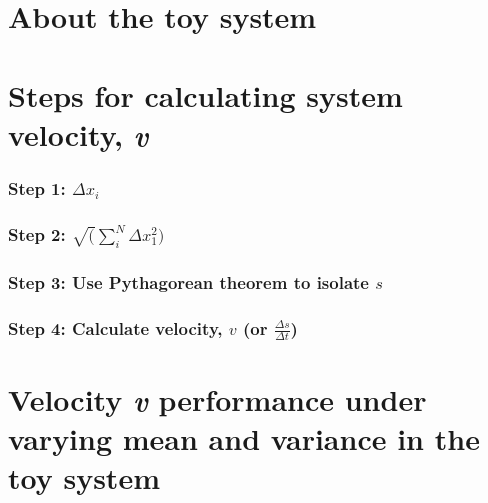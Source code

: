 \documentclass[12pt,twoside,openany]{reedthesis}
\begin{document}
\hypertarget{about-the-toy-system}{%
\section{About the toy system}\label{about-the-toy-system}}

\hypertarget{steps-for-calculating-system-velocity-v}{%
\section{\texorpdfstring{Steps for calculating system velocity, \emph{v}}{Steps for calculating system velocity, v}}\label{steps-for-calculating-system-velocity-v}}

\hypertarget{step-1-delta-x_i}{%
\subsubsection{\texorpdfstring{Step 1: \(\Delta x_i\)}{Step 1: \textbackslash{}Delta x\_i}}\label{step-1-delta-x_i}}

\hypertarget{step-2-sqrtsum_indelta-x_12}{%
\subsubsection{\texorpdfstring{Step 2: \(\sqrt(\sum_i^N\Delta x_1^2)\)}{Step 2: \textbackslash{}sqrt(\textbackslash{}sum\_i\^{}N\textbackslash{}Delta x\_1\^{}2)}}\label{step-2-sqrtsum_indelta-x_12}}

\hypertarget{step-3-use-pythagorean-theorem-to-isolate-s}{%
\subsubsection{\texorpdfstring{Step 3: Use Pythagorean theorem to isolate \(s\)}{Step 3: Use Pythagorean theorem to isolate s}}\label{step-3-use-pythagorean-theorem-to-isolate-s}}

\hypertarget{step-4-calculate-velocity-v-or-frac-delta-sdelta-t}{%
\subsubsection{\texorpdfstring{Step 4: Calculate velocity, \(v\) (or \(\frac {\Delta s}{\Delta t}\))}{Step 4: Calculate velocity, v (or \textbackslash{}frac \{\textbackslash{}Delta s\}\{\textbackslash{}Delta t\})}}\label{step-4-calculate-velocity-v-or-frac-delta-sdelta-t}}

\hypertarget{velocity-v-performance-under-varying-mean-and-variance-in-the-toy-system}{%
\section{\texorpdfstring{Velocity \emph{v} performance under varying mean and variance in the toy system}{Velocity v performance under varying mean and variance in the toy system}}\label{velocity-v-performance-under-varying-mean-and-variance-in-the-toy-system}}
\end{document}
